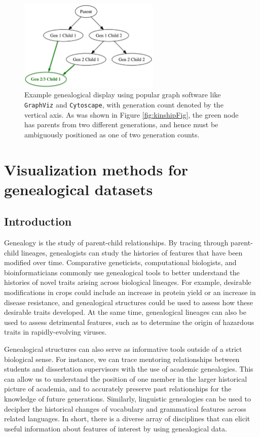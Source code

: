 \documentclass[11pt,a4paper,oldfontcommands,openany]{memoir}
\numberwithin{equation}{section} %
\newcommand{\pkg}[1]{{\texttt{#1}}}
\begin{document}
\begin{figure}[H]
    \begin{framed}
    \centering
    \includegraphics[width=0.6\textwidth]{Graph}
    \end{framed}
    \caption{Example genealogical display using popular graph software like \pkg{GraphViz} and \pkg{Cytoscape}, with generation count denoted by the vertical axis. As was shown in Figure \ref{fig:kinshipFig}, the green node has parents from two different generations, and hence must be ambiguously positioned as one of two generation counts.}
    \label{fig:Graph}
\end{figure}

\chapter{Visualization methods for genealogical datasets}
\label{sec:ggenealogy}

\section{Introduction}

Genealogy is the study of parent-child relationships. By tracing through parent-child lineages, genealogists can study the histories of features that have been modified over time. Comparative geneticists, computational biologists, and bioinformaticians commonly use genealogical tools to better understand the histories of novel traits arising across biological lineages. For example, desirable modifications in crops could include an increase in protein yield or an increase in disease resistance, and genealogical structures could be used to assess how these desirable traits developed. At the same time, genealogical lineages can also be used to assess detrimental features, such as to determine the origin of hazardous traits in rapidly-evolving viruses.

Genealogical structures can also serve as informative tools outside of a strict biological sense. For instance, we can trace mentoring relationships between students and dissertation supervisors with the use of academic genealogies. This can allow us to understand the position of one member in the larger historical picture of academia, and to accurately preserve past relationships for the knowledge of future generations. Similarly, linguistic genealogies can be used to decipher the historical changes of vocabulary and grammatical features across related languages. In short, there is a diverse array of disciplines that can elicit useful information about features of interest by using genealogical data.
\end{document}

